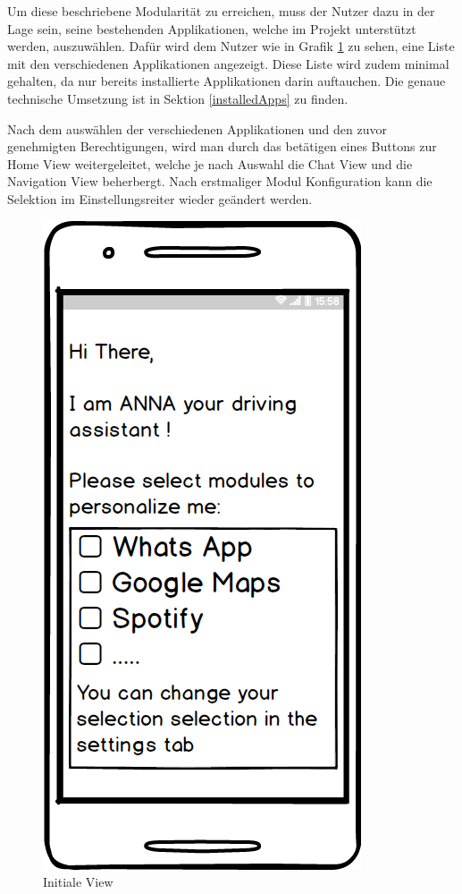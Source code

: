 Um diese beschriebene Modularität zu erreichen, muss der Nutzer dazu in der Lage sein, seine bestehenden Applikationen, welche im Projekt unterstützt werden, auszuwählen. Dafür wird dem Nutzer wie in Grafik \ref{figInitView} zu sehen, eine Liste mit den verschiedenen Applikationen angezeigt. Diese Liste wird zudem minimal gehalten, da nur bereits installierte Applikationen darin auftauchen. Die genaue technische Umsetzung ist in Sektion \ref{installedApps} zu finden. 

Nach dem auswählen der verschiedenen Applikationen und den zuvor genehmigten Berechtigungen, wird man durch das betätigen eines Buttons zur Home View weitergeleitet, welche je nach Auswahl die Chat View und die Navigation View beherbergt. Nach erstmaliger Modul Konfiguration kann die Selektion im Einstellungsreiter wieder geändert werden.

\begin{figure}[h]
	\centering
  \includegraphics[scale=0.5]{images/initScreen.png}
	\caption{Initiale View}
	\label{figInitView}
\end{figure}

